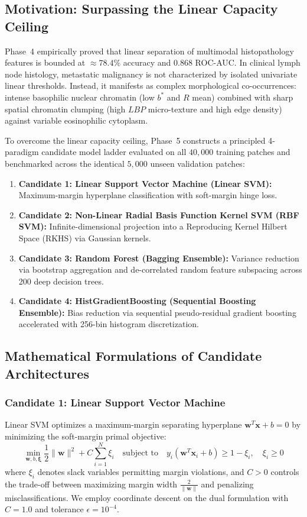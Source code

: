 \documentclass[11pt,a4paper]{article}
\begin{document}
\subsection{Motivation: Surpassing the Linear Capacity Ceiling}
Phase~4 empirically proved that linear separation of multimodal histopathology features is bounded at $\approx 78.4\%$ accuracy and $0.868$ ROC-AUC. In clinical lymph node histology, metastatic malignancy is not characterized by isolated univariate linear thresholds. Instead, it manifests as complex morphological co-occurrences: intense basophilic nuclear chromatin (low $b^*$ and $R$ mean) combined with sharp spatial chromatin clumping (high $LBP$ micro-texture and high edge density) against variable eosinophilic cytoplasm. 

To overcome the linear capacity ceiling, Phase~5 constructs a principled 4-paradigm candidate model ladder evaluated on all $40,000$ training patches and benchmarked across the identical $5,000$ unseen validation patches:
\begin{enumerate}[leftmargin=*, noitemsep]
    \item \textbf{Candidate 1: Linear Support Vector Machine (Linear SVM):} Maximum-margin hyperplane classification with soft-margin hinge loss.
    \item \textbf{Candidate 2: Non-Linear Radial Basis Function Kernel SVM (RBF SVM):} Infinite-dimensional projection into a Reproducing Kernel Hilbert Space (RKHS) via Gaussian kernels.
    \item \textbf{Candidate 3: Random Forest (Bagging Ensemble):} Variance reduction via bootstrap aggregation and de-correlated random feature subspacing across 200 deep decision trees.
    \item \textbf{Candidate 4: HistGradientBoosting (Sequential Boosting Ensemble):} Bias reduction via sequential pseudo-residual gradient boosting accelerated with 256-bin histogram discretization.
\end{enumerate}

\subsection{Mathematical Formulations of Candidate Architectures}

\subsubsection{Candidate 1: Linear Support Vector Machine}
Linear SVM optimizes a maximum-margin separating hyperplane $\mathbf{w}^T \mathbf{x} + b = 0$ by minimizing the soft-margin primal objective:
\begin{equation}
    \min_{\mathbf{w}, b, \boldsymbol{\xi}} \frac{1}{2}\|\mathbf{w}\|^2 + C \sum_{i=1}^N \xi_i \quad \text{subject to} \quad y_i(\mathbf{w}^T \mathbf{x}_i + b) \ge 1 - \xi_i, \quad \xi_i \ge 0
\end{equation}
where $\xi_i$ denotes slack variables permitting margin violations, and $C > 0$ controls the trade-off between maximizing margin width $\frac{2}{\|\mathbf{w}\|}$ and penalizing misclassifications. We employ coordinate descent on the dual formulation with $C=1.0$ and tolerance $\epsilon = 10^{-4}$.
\end{document}
